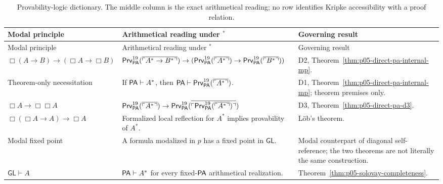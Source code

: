 \begingroup\small
\begin{longtable}{@{}p{}p{}p{}@{}}
\caption{Provability-logic dictionary.  The middle column is
the exact arithmetical reading; no row identifies Kripke accessibility with a
proof relation.}
\label{tab:p05-provability-dictionary}\\
\toprule
Modal principle & Arithmetical reading under \(^*\) & Governing result \\
\midrule
\endfirsthead
\toprule
Modal principle & Arithmetical reading under \(^*\) & Governing result \\
\midrule
\endhead
\(\Box(A\to B)\to(\Box A\to\Box B)\) &
\(\mathsf{Prv}^{19}_{\mathsf{PA}}(\overline{\ulcorner A^*\to B^*\urcorner})\to
(\mathsf{Prv}^{19}_{\mathsf{PA}}(\overline{\ulcorner A^*\urcorner})\to
 \mathsf{Prv}^{19}_{\mathsf{PA}}(\overline{\ulcorner B^*\urcorner}))\) &
D2, Theorem~\ref{thm:p05-direct-pa-internal-mp}. \\
\addlinespace
Theorem-only necessitation & If \(\mathsf{PA}\vdash A^*\), then
\(\mathsf{PA}\vdash\mathsf{Prv}^{19}_{\mathsf{PA}}
(\overline{\ulcorner A^*\urcorner})\). &
D1, Theorem~\ref{thm:p05-direct-pa-internal-mp}; theorem premises only. \\
\addlinespace
\(\Box A\to\Box\Box A\) &
\(\mathsf{Prv}^{19}_{\mathsf{PA}}(\overline{\ulcorner A^*\urcorner})\to
\mathsf{Prv}^{19}_{\mathsf{PA}}(\overline{\ulcorner
\mathsf{Prv}^{19}_{\mathsf{PA}}(\overline{\ulcorner A^*\urcorner})\urcorner})\) &
D3, Theorem~\ref{thm:p05-direct-pa-d3}. \\
\addlinespace
\(\Box(\Box A\to A)\to\Box A\) & Formalized local reflection for
\(A^*\) implies provability of \(A^*\). &
L\"ob's theorem. \\
\addlinespace
Modal fixed point & A formula modalized in \(p\) has a fixed point in
\(\mathsf{GL}\). & Modal counterpart of diagonal self-reference; the two
theorems are not literally the same construction. \\
\addlinespace
\(\mathsf{GL}\vdash A\) & \(\mathsf{PA}\vdash A^*\) for every fixed-\(\mathsf{PA}\)
arithmetical realization. & Theorem~\ref{thm:p05-solovay-completeness}. \\
\bottomrule
\end{longtable}
\endgroup

